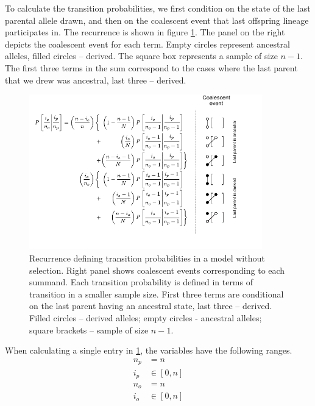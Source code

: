 \documentclass[review]{elsarticle}
\newcommand{\sgcomment}[1]{{\color{red}{SG: #1}}}
\begin{document}
To calculate the transition probabilities, we first condition on the state of the last parental
allele drawn, and then on the coalescent event that last offspring lineage participates in. The
recurrence is shown in figure \ref{fig:rec-neutral}. The panel on the right depicts the coalescent
event for each term. Empty circles represent ancestral alleles, filled circles -- derived. The
square box represents a sample of size $n-1$. The first three terms in the sum correspond to the
cases where the last parent that we drew was ancestral, last three -- derived.
\sgcomment{Would it be worth presenting the non-square transition probabilites as well to prepare the reader for what comes next with selection}

\begin{figure}
  \centering
  \includegraphics[width=0.9\textwidth]{fig/recurrence-neutral-annotated.pdf}
  \caption{Recurrence defining transition probabilities in a model without selection. Right panel
    shows coalescent events corresponding to each summand. Each transition probability is defined in
    terms of transition in a smaller sample size. First three terms are conditional on the last
    parent having an ancestral state, last three -- derived. Filled circles -- derived alleles;
    empty circles - ancestral alleles; square brackets -- sample of size $n-1$.}
  \label{fig:rec-neutral}
\end{figure}

When calculating a single entry in \ref{fig:rec-neutral}, the variables have the following ranges.
\begin{equation}
  \begin{aligned}
    n_p &= n \\
    i_p &\in [0, n] \\
    n_o &= n \\
    i_o &\in [0, n] \\
  \end{aligned}
\end{equation}
\end{document}
